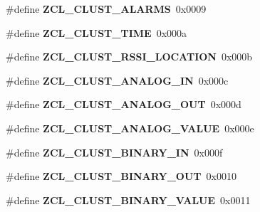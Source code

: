 \begin{DoxyCompactItemize}
\item 
\hypertarget{group__zcl_ga660f2cbe707f2fa1089363d782726876}{\#define {\bfseries Z\-C\-L\-\_\-\-C\-L\-U\-S\-T\-\_\-\-A\-L\-A\-R\-M\-S}~0x0009}\label{group__zcl_ga660f2cbe707f2fa1089363d782726876}

\item 
\hypertarget{group__zcl_gaf21f5b2c5bed64debf5d817a65d83d69}{\#define {\bfseries Z\-C\-L\-\_\-\-C\-L\-U\-S\-T\-\_\-\-T\-I\-M\-E}~0x000a}\label{group__zcl_gaf21f5b2c5bed64debf5d817a65d83d69}

\item 
\hypertarget{group__zcl_gac13b2895b15d1293afb359996709e638}{\#define {\bfseries Z\-C\-L\-\_\-\-C\-L\-U\-S\-T\-\_\-\-R\-S\-S\-I\-\_\-\-L\-O\-C\-A\-T\-I\-O\-N}~0x000b}\label{group__zcl_gac13b2895b15d1293afb359996709e638}

\item 
\hypertarget{group__zcl_ga2b4fbabe7511a86fae352f564bed3012}{\#define {\bfseries Z\-C\-L\-\_\-\-C\-L\-U\-S\-T\-\_\-\-A\-N\-A\-L\-O\-G\-\_\-\-I\-N}~0x000c}\label{group__zcl_ga2b4fbabe7511a86fae352f564bed3012}

\item 
\hypertarget{group__zcl_gad3a725684cb791e5a9c0e84d8549bb6a}{\#define {\bfseries Z\-C\-L\-\_\-\-C\-L\-U\-S\-T\-\_\-\-A\-N\-A\-L\-O\-G\-\_\-\-O\-U\-T}~0x000d}\label{group__zcl_gad3a725684cb791e5a9c0e84d8549bb6a}

\item 
\hypertarget{group__zcl_gabece8a12cc79a662e518016d3b1378b5}{\#define {\bfseries Z\-C\-L\-\_\-\-C\-L\-U\-S\-T\-\_\-\-A\-N\-A\-L\-O\-G\-\_\-\-V\-A\-L\-U\-E}~0x000e}\label{group__zcl_gabece8a12cc79a662e518016d3b1378b5}

\item 
\hypertarget{group__zcl_ga54bc6473ba454f3f84251bd37a2d1dc5}{\#define {\bfseries Z\-C\-L\-\_\-\-C\-L\-U\-S\-T\-\_\-\-B\-I\-N\-A\-R\-Y\-\_\-\-I\-N}~0x000f}\label{group__zcl_ga54bc6473ba454f3f84251bd37a2d1dc5}

\item 
\hypertarget{group__zcl_gab553808690d6f12100305f090909e501}{\#define {\bfseries Z\-C\-L\-\_\-\-C\-L\-U\-S\-T\-\_\-\-B\-I\-N\-A\-R\-Y\-\_\-\-O\-U\-T}~0x0010}\label{group__zcl_gab553808690d6f12100305f090909e501}

\item 
\hypertarget{group__zcl_ga8b482af4088fea7de7a3ff70dfd6cdb6}{\#define {\bfseries Z\-C\-L\-\_\-\-C\-L\-U\-S\-T\-\_\-\-B\-I\-N\-A\-R\-Y\-\_\-\-V\-A\-L\-U\-E}~0x0011}\label{group__zcl_ga8b482af4088fea7de7a3ff70dfd6cdb6}


\end{DoxyCompactItemize}
